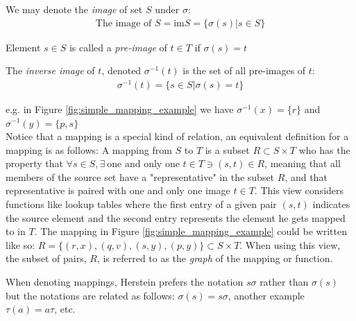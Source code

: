 \begin{definition}
We may denote the \textit{image} of set $S$ under $\sigma$:
\begin{align}
    \text{The image of } S = \text{im} S= \{\sigma(s)|s\in S\}\nonumber
\end{align}
\end{definition} 
\begin{definition}
Element $s\in S$ is called a \textit{pre-image} of $t\in T$ if $\sigma(s)=t$
\end{definition}
\begin{definition}
The \textit{inverse image} of $t$, denoted $\sigma^{-1}(t)$ is the set of all pre-images of $t$:
\begin{align}
    \sigma^{-1}(t)=\{s\in S | \sigma(s)=t \}\nonumber
\end{align}
\end{definition}
e.g. in Figure \ref{fig:simple_mapping_example} we have $\sigma^{-1}(x)=\{r\}$ and $\sigma^{-1}(y)=\{p,s\}$\steezybreak\\
Notice that a mapping is a special kind of relation, an equivalent definition for a mapping is as follows: A mapping from $S$ to $T$ is a subset $R\subset S \times T$ who has the property that $\forall s \in S, \exists \ \text{one and only one } t\in T \ni (s,t)\in R$, meaning that all members of the source set have a "representative" in the subset $R$, and that representative is paired with one and only one image $t\in T$. This view considers functions like lookup tables where the first entry of a given pair $(s,t)$ indicates the source element and the second entry represents the element he gets mapped to in $T$. The mapping in Figure \ref{fig:simple_mapping_example} could be written like so: $R=\{(r,x),(q,v),(s,y),(p,y)\} \subset S\times T$. When using this view, the subset of pairs, $R$, is referred to as the \textit{graph} of the mapping or function. 
\begin{notation}
When denoting mappings, Herstein prefers the notation $s\sigma$ rather than $\sigma(s)$ but the notations are related as follows: $\sigma(s) = s\sigma$, another example $\tau(a)=a\tau$, etc. 
\end{notation}

